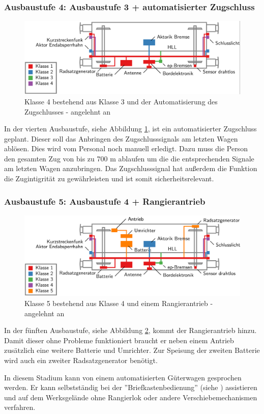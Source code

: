 \subsubsection{Ausbaustufe 4: Ausbaustufe 3 + automatisierter Zugschluss}
\begin{figure}[htbp] 
    \includegraphics[width=\textwidth]{Bilder/Ausbaustufen_4.PNG}
    \caption{Klasse 4 bestehend aus Klasse 3 und der Automatisierung des Zugschlusses - angelehnt an \cite{ETR_3}}
    \label{fig:Klasse4}
\end{figure} 
In der vierten Ausbaustufe, siehe Abbildung \ref{fig:Klasse4}, ist ein automatisierter Zugschluss geplant. Dieser soll das Anbringen des Zugschlusssignals am letzten Wagen ablösen. Dies wird vom Personal noch manuell erledigt. Dazu muss die Person den gesamten Zug von bis zu 700 m ablaufen um die die entsprechenden Signale am letzten Wagen anzubringen. Das Zugschlusssignal hat außerdem die Funktion die Zugintigrität zu gewährleisten und ist somit sicherheitsrelevant. 
\subsubsection{Ausbaustufe 5: Ausbaustufe 4 + Rangierantrieb} \label{sec:A5}
\begin{figure}[htbp] 
    \includegraphics[width=\textwidth]{Bilder/Ausbaustufen_5.PNG}
    \caption{Klasse 5 bestehend aus Klasse 4 und einem Rangierantrieb - angelehnt an \cite{ETR_3}}
    \label{fig:Klasse5}
\end{figure} 
In der fünften Ausbaustufe, siehe Abbildung \ref{fig:Klasse5}, kommt der Rangierantrieb hinzu. Damit dieser ohne Probleme funktioniert braucht er neben einem Antrieb zusätzlich eine weitere Batterie und Umrichter. Zur Speisung der zweiten Batterie wird auch ein zweiter Radsatzgenerator benötigt.\par
In diesem Stadium kann von einem automatisierten Güterwagen gesprochen werden. Er kann selbstständig bei der ''Briefkastenbedienung'' (siehe \cite{GAK}) assistieren und auf dem Werksgelände ohne Rangierlok oder andere Verschiebemechanismen verfahren.